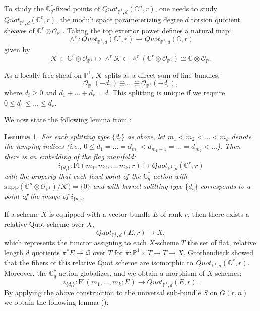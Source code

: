 \documentclass{amsart}
\newtheorem{lemma}[thm]{Lemma}
\begin{document}
To study the $\mathbb{C}_q^*$-fixed points of $Quot_{\mathbb{P}^1,d}(\mathbb{C}^n,r)$, one needs to study $Quot_{\mathbb{P}^1,d}(\mathbb{C}^r,r)$, the moduli space parameterizing degree $d$ torsion quotient sheaves of 
$\mathbb{C}^r \otimes \mathcal{O}_{\mathbb{P}^1}$. Taking the top exterior power defines a natural map:
\[
\wedge^r : Quot_{\mathbb{P}^1,d}(\mathbb{C}^r,r) \to Quot_{\mathbb{P}^1,d}(\mathbb{C},r)
\]
given by
\[
\mathcal{K} \subset \mathbb{C}^r \otimes \mathcal{O}_{\mathbb{P}^1} \mapsto \wedge^r \mathcal{K} \subset \wedge^r (\mathbb{C}^r \otimes \mathcal{O}_{\mathbb{P}^1}) \cong \mathbb{C} \otimes \mathcal{O}_{\mathbb{P}^1}
\]

As a locally free sheaf on $\mathbb{P}^1$, $\mathcal{K}$ splits as a direct sum of line bundles:
\[
\mathcal{O}_{\mathbb{P}^1}(-d_1) \oplus \dots \oplus \mathcal{O}_{\mathbb{P}^1}(-d_r), 
\]
where $d_i \ge 0$ and $d_1+\dots+d_r=d$. This splitting is unique if we require $0 \le d_1 \le \dots \le d_r$.


 We now state the following lemma from \cite[Lemma 1.1]{Bertram:2003qd}:
\begin{lemma}\label{lemma 3.1}
    For each splitting type $\{d_i\}$ as above, let $m_1 <m_2 <\dots<m_k$ denote the jumping indices (i.e., $0 \leq d_1=\dots=d_{m_1} < d_{m_1 +1}=\dots=d_{m_2}<\dots$). Then there is an embedding of the flag manifold:
    \[
    i_{\{d_i\}}:\mathrm{Fl}(m_1,m_2,\dots,m_k;r) \hookrightarrow Quot_{\mathbb{P}^1,d}(\mathbb{C}^r,r)
    \]
    with the property that each fixed point of the $\mathbb{C}_q^*$-action with $\mathrm{supp}(\mathbb{C}^n \otimes \mathcal{O}_{\mathbb{P}^1})/\mathcal{K})=\{0\}$ and with kernel splitting type $\{d_i\}$ corresponds to a point of the image of $i_{\{d_i\}}$.        
\end{lemma}
 If a scheme $X$ is equipped with a vector bundle $E$ of rank $r$, then there exists a relative Quot scheme over $X$, 
\[
Quot_{\mathbb{P}^1,d}(E,r) \to X,
\]
which represents the functor assigning to each $X$-scheme $T$ the set of   flat, relative length $d$ quotients $\pi^*E \twoheadrightarrow \mathcal{Q}$ over $T$ for $\pi: \mathbb{P}^1 \times T \to T \to X$. Grothendieck showed that the fibers of this relative Quot scheme are isomorphic to $Quot_{\mathbb{P}^1,d}(\mathbb{C}^r,r)$. Moreover,  the $\mathbb{C}_q^*$-action globalizes, and we obtain a morphism of $X$ schemes:
\[
i_{\{d_i\}}:\mathrm{Fl}(m_1,\dots,m_k;E) \to Quot_{\mathbb{P}^1,d}(E,r).
\]
By applying the above construction to the universal sub-bundle $S$ on $G(r,n)$ we obtain the following lemma   (\cite[Lemma 1.2]{Bertram:2003qd}):
\end{document}
